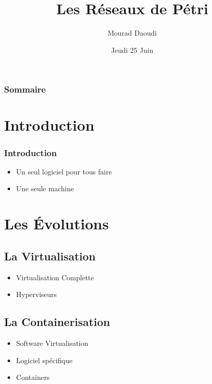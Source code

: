 \documentclass[11pt]{beamer}
\author{Mourad Daoudi}
\title{Les Réseaux de Pétri}
\institute{USTHB}
\date{Jeudi 25 Juin}
\begin{document}
	\maketitle
	\begin{frame}
		\frametitle{Sommaire}
		\tableofcontents{}
	\end{frame}
	\section{Introduction}
	\begin{frame}
		\frametitle{Introduction}
		\begin{center}
			\begin{itemize}
				\item Un seul logiciel pour tous faire
				\item Une seule machine
			\end{itemize}
		\end{center}
	\end{frame}
	
	\section{Les Évolutions}
	\subsection{La Virtualisation}
	\begin{frame}
		\begin{itemize}
			\item Virtualisation Complette
			\item Hyperviseurs \\%
		\end{itemize}
	\end{frame}
	\subsection{La Containerisation}
	\begin{frame}
		\begin{itemize}
			\item Software Virtualisation
			\item Logiciel spécifique \\%
		\end{itemize}
	\end{frame}
	\begin{frame}
		\begin{itemize}
			\item Containers %
		\end{itemize}
	\end{frame}
\end{document}
